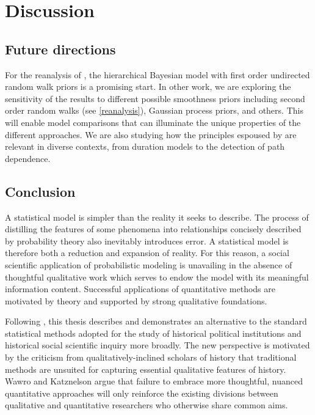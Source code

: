 \chapter{Discussion}
\label{discussion}

\section{Future directions}

For the reanalysis of , the hierarchical Bayesian model with first order 
undirected random walk priors is a promising start. In other work, we are exploring the sensitivity of the 
results to different possible smoothness priors including second order random walks (see \ref{reanalysis}), 
Gaussian process priors, and others. This will enable model comparisons that can illuminate the unique 
properties of the different approaches. We are also studying how the principles 
espoused by  are relevant in diverse contexts, from 
duration models to the detection of path dependence. 
 
\section{Conclusion}

A statistical model is simpler than the reality it seeks to describe. The process of 
distilling the features of some phenomena into relationships concisely described by  
probability theory also inevitably introduces error. A statistical model is therefore both 
a reduction and expansion of reality. For this reason, a social scientific application of 
probabilistic modeling is unavailing in the absence of thoughtful qualitative work which
serves to endow the model with its meaningful information content. Successful applications 
of quantitative methods are motivated by theory and supported by strong qualitative foundations. 

Following , this thesis describes and demonstrates 
an alternative to the standard statistical methods adopted for the study of historical 
political institutions and historical social scientific inquiry more broadly. The new perspective is 
motivated by the criticism from qualitatively-inclined scholars of history that traditional methods 
are unsuited for capturing essential qualitative features of history. 
Wawro and Katznelson argue that failure to embrace more thoughtful, nuanced quantitative 
approaches will only reinforce the existing divisions between qualitative and quantitative 
researchers who otherwise share common aims. 

